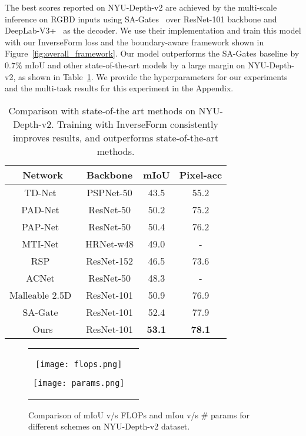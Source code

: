 \documentclass[final]{cvpr}
\begin{document}
The best scores reported on NYU-Depth-v2 are achieved by the multi-scale inference on RGBD inputs using SA-Gates~\cite{chen2020bidirectional} over ResNet-101 backbone and DeepLab-V3+~\cite{chen2017deeplab} as the decoder. We use their implementation and train this model with our InverseForm loss and the boundary-aware framework shown in Figure~\ref{fig:overall_framework}. Our model outperforms the SA-Gates baseline by 0.7\% mIoU and other state-of-the-art models by a large margin on NYU-Depth-v2, as shown in Table~\ref{tab:nyud_1}. We provide the hyperparameters for our experiments and the multi-task results for this experiment in the Appendix.


\begin{table}[t]

  \begin{tabular}{cc| cc} 
 \hline
 Network & Backbone & mIoU & Pixel-acc \\ 
 \hline
 \hline
  TD-Net~\cite{hu2020temporally} & PSPNet-50 & 43.5 & 55.2 \\ 
  PAD-Net~\cite{xu2018pad} & ResNet-50 & 50.2 & 75.2 \\   
  PAP-Net~\cite{zhang2019patternaffinitive} & ResNet-50 & 50.4 & 76.2 \\  
  MTI-Net~\cite{vandenhende2020mti} & HRNet-w48 & 49.0 & - \\   
  RSP~\cite{kong2017recurrent} & ResNet-152 & 46.5 & 73.6 \\
  ACNet~\cite{hu2019acnet} & ResNet-50 & 48.3 & - \\
  Malleable 2.5D~\cite{xing2020malleable} & ResNet-101 & 50.9 & 76.9 \\ 
  SA-Gate~\cite{chen2020bidirectional} & ResNet-101 & 52.4 & 77.9 \\ 
 \hline
  Ours & ResNet-101 & \textbf{53.1} & \textbf{78.1}\\
  \hline
\end{tabular}

\caption{ Comparison with state-of-the art methods on NYU-Depth-v2. Training with InverseForm consistently improves results, and outperforms state-of-the-art methods.}\label{tab:nyud_1}
\end{table}

\begin{figure}[t]
\begin{tabularx}{\textwidth}{cc}
    \hspace{-4mm}
     \texttt{[image: flops.png]}

     \texttt{[image: params.png]}
\end{tabularx}

\caption{Comparison of mIoU v/s FLOPs and mIou v/s \# params for different schemes on NYU-Depth-v2 dataset.}\label{fig:miou_flops_nyud}
\end{figure}
\end{document}
